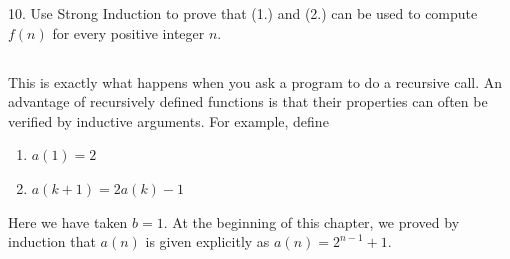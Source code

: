 \documentclass{article}
\newcommand{\0}{\mathbf 0}
\newcommand{\1}{\mathbf 1}
\begin{document}
\begin{description}
  \item{10.} Use Strong Induction to prove that (1.) and (2.) can be used to compute $f(n)$ for every positive integer $n$.
\end{description}

\subsection*{ }

This is exactly what happens when you ask a program to do a recursive call. An advantage of recursively defined functions is that their properties can often be verified by inductive arguments. For example, define
\begin{enumerate}[\hspace{1cm}(1.)]
  \item $a(1) = 2$
  \item $a(k+1) = 2a(k) - 1$
\end{enumerate}

Here we have taken $b = 1$. At the beginning of this chapter, we proved by induction that $a(n)$ is given explicitly as $a(n) = 2^{n-1} + 1$.

\subsection*{ }
\end{document}
